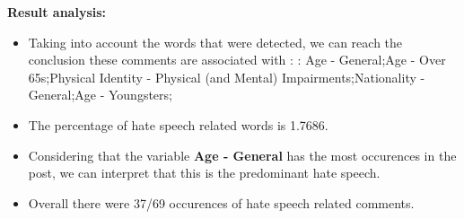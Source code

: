 \documentclass[11pt]{article}
\begin{document}
\textbf{\Large Result analysis:}

\begin{itemize}\item Taking into account the words that were detected, we can reach the conclusion these comments are associated with : : Age - General;Age - Over 65s;Physical Identity - Physical (and Mental) Impairments;Nationality - General;Age - Youngsters;%

\item The percentage of hate speech related words is 1.7686.

\item Considering that the variable \textbf{Age - General} has the most occurences in the post, we can interpret that this is the predominant hate speech.

\item Overall there were 37/69 occurences of hate speech related comments.\end{itemize}
\end{document}
